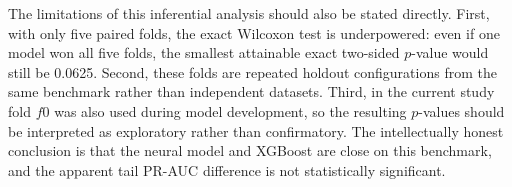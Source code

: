The limitations of this inferential analysis should also be stated directly. First, with only five paired folds, the exact Wilcoxon test is underpowered: even if one model won all five folds, the smallest attainable exact two-sided \(p\)-value would still be 0.0625. Second, these folds are repeated holdout configurations from the same benchmark rather than independent datasets. Third, in the current study fold \(f0\) was also used during model development, so the resulting \(p\)-values should be interpreted as exploratory rather than confirmatory. The intellectually honest conclusion is that the neural model and XGBoost are close on this benchmark, and the apparent tail PR-AUC difference is not statistically significant.
